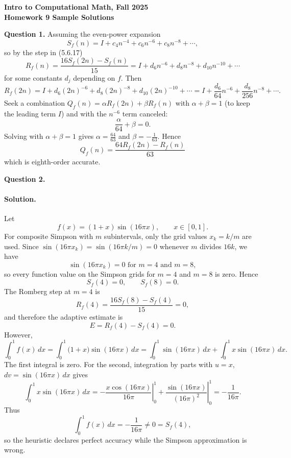 \documentclass[11pt]{article}
\begin{document}
\begin{center}
{\bf Intro to Computational Math, Fall 2025\\
Homework 9 Sample Solutions}
\end{center}

{\bf Question 1.}
Assuming the even-power expansion
\[
S_f(n)=I+c_4 n^{-4}+c_6 n^{-6}+c_8 n^{-8}+\cdots,
\]
so by the step in (5.6.17)
\[
R_f(n)=\frac{16 S_f(2n)-S_f(n)}{15}
      =I+d_6 n^{-6}+d_8 n^{-8}+d_{10} n^{-10}+\cdots
\]
for some constants \(d_j\) depending on \(f\). Then
\[
R_f(2n)=I+d_6 (2n)^{-6}+d_8 (2n)^{-8}+d_{10} (2n)^{-10}+\cdots
      =I+\frac{d_6}{64} n^{-6}+\frac{d_8}{256} n^{-8}+\cdots.
\]
Seek a combination \(Q_f(n)=\alpha R_f(2n)+\beta R_f(n)\) with \(\alpha+\beta=1\) (to keep the leading term \(I\)) and with the \(n^{-6}\) term canceled:
\[
\frac{\alpha}{64}+\beta=0.
\]
Solving with \(\alpha+\beta=1\) gives \(\alpha=\tfrac{64}{63}\) and \(\beta=-\tfrac{1}{63}\). Hence
\[
\boxed{\,Q_f(n)=\frac{64 R_f(2n)-R_f(n)}{63}\,}
\]
which is eighth-order accurate.


\newpage



{\bf Question 2.}


\paragraph{Solution.}
Let
\[
f(x)=(1+x)\sin(16\pi x), \qquad x\in[0,1].
\]
For composite Simpson with \(m\) subintervals, only the grid values \(x_k=k/m\) are used. Since \(\sin(16\pi x_k)=\sin(16\pi k/m)=0\) whenever \(m\) divides \(16k\), we have
\[
\sin(16\pi x_k)=0 \text{ for } m=4 \text{ and } m=8,
\]
so every function value on the Simpson grids for \(m=4\) and \(m=8\) is zero. Hence
\[
S_f(4)=0, \qquad S_f(8)=0.
\]
The Romberg step at \(m=4\) is
\[
R_f(4)=\frac{16 S_f(8)-S_f(4)}{15}=0,
\]
and therefore the adaptive estimate is
\[
E=R_f(4)-S_f(4)=0.
\]
However,
\[
\int_0^1 f(x)\,dx=\int_0^1 \bigl(1+x\bigr)\sin(16\pi x)\,dx
=\int_0^1 \sin(16\pi x)\,dx+\int_0^1 x\sin(16\pi x)\,dx.
\]
The first integral is zero. For the second, integration by parts with \(u=x\), \(dv=\sin(16\pi x)\,dx\) gives
\[
\int_0^1 x\sin(16\pi x)\,dx
=\left.-\frac{x\cos(16\pi x)}{16\pi}\right|_0^1+\left.\frac{\sin(16\pi x)}{(16\pi)^2}\right|_0^1
=-\frac{1}{16\pi}.
\]
Thus
\[
\int_0^1 f(x)\,dx=-\frac{1}{16\pi}\neq 0=S_f(4),
\]
so the heuristic declares perfect accuracy while the Simpson approximation is wrong.




\newpage
\end{document}
